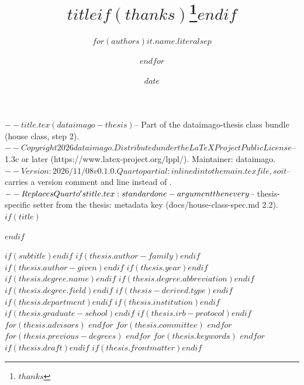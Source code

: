 $-- title.tex (dataimago-thesis)
$-- Part of the dataimago-thesis class bundle (house class, step 2).
$-- Copyright 2026 dataimago. Distributed under the LaTeX Project Public License
$-- 1.3c or later (https://www.latex-project.org/lppl/). Maintainer: dataimago.
$-- Version: 2026/11/08 v0.1.0. Quarto partial: inlined into the main .tex file, so it
$-- carries a version comment and \typeout line instead of \ProvidesFile.
$-- Replaces Quarto's title.tex: standard one-argument \title/\author/\date, then every
$-- thesis-specific setter from the thesis: metadata key (docs/house-class-spec.md 2.2).
$if(title)$
\title{$title$$if(thanks)$\thanks{$thanks$}$endif$}
$endif$
\author{$for(authors)$$it.name.literal$$sep$ \and $endfor$}
\date{$date$}
$if(subtitle)$$endif$
$if(thesis.author-family)$$endif$
$if(thesis.author-given)$$endif$
$if(thesis.year)$$endif$
$if(thesis.degree.name)$$endif$
$if(thesis.degree.abbreviation)$$endif$
$if(thesis.degree.field)$$endif$
$if(thesis-derived.type)$$endif$
$if(thesis.department)$$endif$
$if(thesis.institution)$$endif$
$if(thesis.graduate-school)$$endif$
$if(thesis.irb-protocol)$$endif$
$for(thesis.advisors)$
$endfor$
$for(thesis.committee)$
$endfor$
$for(thesis.previous-degrees)$
$endfor$
$for(thesis.keywords)$
$endfor$
$if(thesis.draft)$$endif$
$if(thesis.frontmatter)$$endif$
